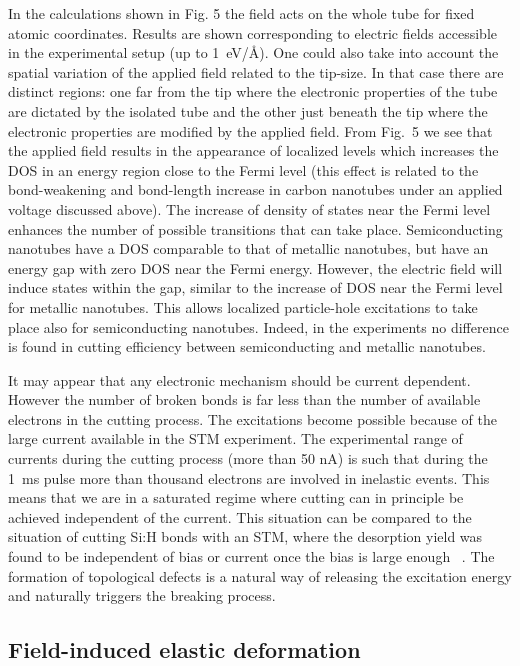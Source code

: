 \begin{multicols}{2}
In the calculations shown in Fig. 5 the field acts on the whole
tube for fixed atomic coordinates. Results are shown corresponding
to electric fields accessible in the experimental setup (up to
1~eV/\AA). One could also take into account the spatial variation
of the applied field related to the tip-size. In that case there
are distinct regions: one far from the tip where the electronic
properties of the tube are dictated by the isolated tube and the
other just beneath the tip where the electronic properties are
modified by the applied field. From Fig.~5 we see that the applied
field results in the appearance of localized levels which
increases the DOS in an energy region close to the Fermi level
(this effect is related to the bond-weakening and bond-length
increase in carbon nanotubes under an applied voltage discussed
above). The increase of density of states near the Fermi level
enhances the number of possible transitions that can take place.
Semiconducting nanotubes have a DOS comparable to that of metallic
nanotubes, but have an energy gap with zero DOS near the Fermi
energy. However, the electric field will induce states within the
gap, similar to the increase of DOS near the Fermi level for
metallic nanotubes. This allows localized particle-hole
excitations to take place also for semiconducting nanotubes.
Indeed, in the experiments no difference is found in cutting
efficiency between semiconducting and metallic nanotubes.

It may appear that any electronic mechanism should be current
dependent. However the number of broken bonds is far less than the
number of available electrons in the cutting process. The
excitations become possible because of the large current available
in the STM experiment. The experimental range of currents during
the cutting process (more than 50 nA) is such that during the 1~ms
pulse more than thousand electrons are involved in inelastic
events. This means that we are in a saturated regime where cutting
can in principle be achieved independent of the current. This
situation can be compared to the situation of cutting Si:H bonds
with an STM, where the desorption yield was found to be
independent of bias or current once the bias is large enough~
\cite{petern}. The formation of topological defects is a natural
way of releasing the excitation energy and naturally triggers the
breaking process.

\subsection{Field-induced elastic deformation}


\end{multicols}
